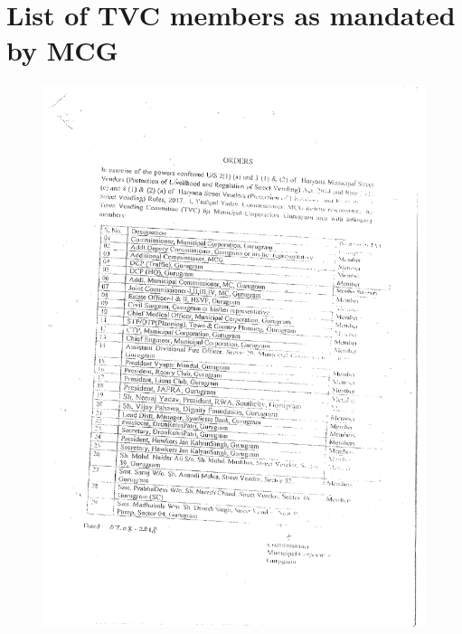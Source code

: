\documentclass[a4paper, 12pt, twoside]{article}
\begin{document}
{{\section{List of TVC members as mandated by MCG}
\label{appendix: TVC members as per MCG}
\begin{figure}[h]
\centering
\includegraphics[width=5.1in]{Appendix6.pdf}
\end{figure}

\newpage
}}
\end{document}
